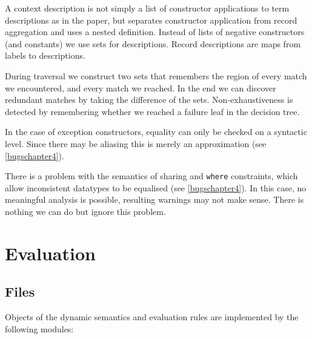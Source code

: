 \documentclass[twoside,titlepage]{article}
\begin{document}
A context description is not simply a list of constructor applications to term descriptions as in the paper, but separates constructor application from record aggregation and uses a nested definition. Instead of lists of negative constructors (and constants) we use sets for descriptions. Record descriptions are maps from labels to descriptions.

During traversal we construct two sets that remembers the region of every match we encountered, and every match we reached. In the end we can discover redundant matches by taking the difference of the sets. Non-exhaustiveness is detected by remembering whether we reached a failure leaf in the decision tree.

In the case of exception constructors, equality can only be checked on a syntactic level. Since there may be aliasing this is merely an approximation (see \ref{bugschapter4}).

There is a problem with the semantics of sharing and {\tt where} constraints, which allow inconsistent datatypes to be equalised (see \ref{bugschapter4}). In this case, no meaningful analysis is possible, resulting warnings may not make sense. There is nothing we can do but ignore this problem.



\section{Evaluation}
\label{evaluation}

\subsection{Files}
\label{evaluationfiles}

Objects of the dynamic semantics and evaluation rules are implemented by the following modules:
\end{document}
